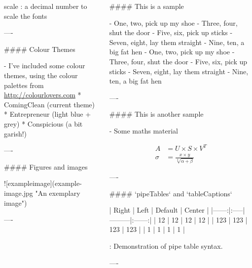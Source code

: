 \documentclass{beamer}
\begin{document}
\begin{frame}[fragile]
\begin{columns}[T]
\begin{column}{.46\textwidth}
\begin{markdown}
    scale
    :   a decimal number to scale the fonts

----

#### Colour Themes

- I've included some colour themes, using the colour palettes from \url{http://colourlovers.com}
    * ComingClean (current theme)
    * Entrepreneur (light blue + grey)
    * Conspicious (a bit garish!)

---- 

#### Figures and images


![exampleimage](example-image.jpg "An exemplary image")

----

\end{markdown}

\end{column}

\begin{column}{.46\textwidth}

\begin{markdown}

#### This is a sample

- One, two, pick up my shoe
- Three, four, shut the door
- Five, six, pick up sticks
- Seven, eight, lay them straight
- Nine, ten, a big fat hen
- One, two, pick up my shoe
- Three, four, shut the door
- Five, six, pick up sticks
- Seven, eight, lay them straight
- Nine, ten, a big fat hen

----

#### This is another sample

- Some maths material

\begin{align}
A &= U \times S \times V^T\\
\sigma &= \frac{x\times y}{\sqrt[3]{\alpha + \beta}}
\end{align}

----


#### `pipeTables` and `tableCaptions`

| Right | Left | Default | Center |
|------:|:-----|---------|:------:| 
|  12   |  12  |  12     |   12   | 
| 123   |  123 |   123   |  123   | 
|   1   |    1 |     1   |    1   | 

  : Demonstration of pipe table syntax.

----

\end{markdown}
\end{column}
\end{columns}


\end{frame}
\end{document}
